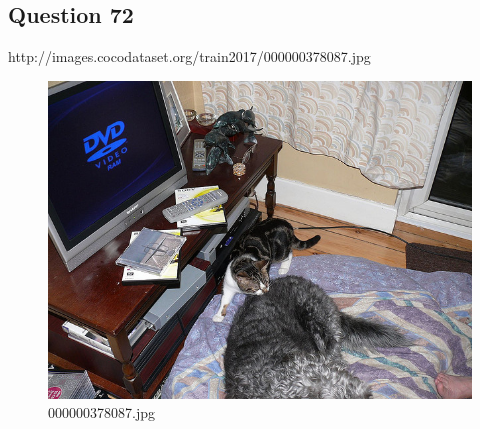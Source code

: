 \subsection*{Question 72}
http://images.cocodataset.org/train2017/000000378087.jpg
\begin{figure}[h]
    \centering
    \includegraphics[width=0.8\linewidth]{../image set/hard/000000378087.jpg}
    \caption{000000378087.jpg}
\end{figure}
